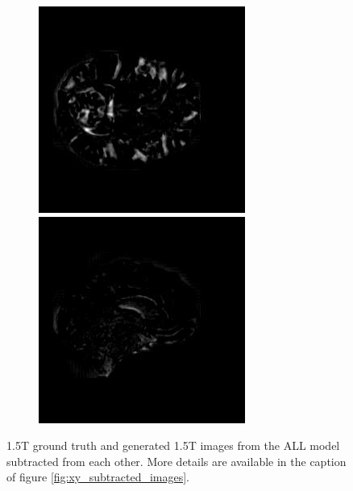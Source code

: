 \documentclass[11pt, fleqn, titlepage]{article}
\newcommand\skipperer{0.45pt}
\newcommand{\1}[1]{\mathds{1}\left[#1\right]}
\begin{document}
\begin{figure}[H]
\begin{subfigure}[b]{0.8\textwidth}
		\hskip\skipperer
		\includegraphics[width=0.22\linewidth]{imgs/subtracted_images/all/136_S_0196_xz_1.5_1.5gen_comparison}
		\hskip\skipperer
		\includegraphics[width=0.22\linewidth]{imgs/subtracted_images/all/136_S_0196_yz_1.5_1.5gen_comparison}
	\end{subfigure}
	\caption{1.5T ground truth and generated 1.5T images from the ALL model subtracted from each other. More details are available in the caption of figure \ref{fig:xy_subtracted_images}.}
	\label{fig:all_subtracted_images}
\end{figure}
\end{document}
